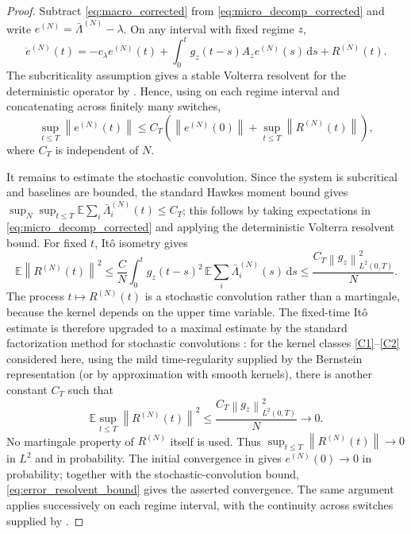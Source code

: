 \documentclass[11pt]{article}
\theoremstyle{plain}
\theoremstyle{definition}
\theoremstyle{remark}
\newcommand{\E}{\mathbb{E}}
\newcommand{\norm}[1]{\left\lVert #1 \right\rVert}
\newcommand{\dd}{\mathrm{d}}
\begin{document}
\begin{proof}
Subtract \eqref{eq:macro_corrected} from \eqref{eq:micro_decomp_corrected} and write
$e^{(N)}=\bar\Lambda^{(N)}-\lambda$. On any interval with fixed regime $z$,
\begin{equation}
\label{eq:error_hydro}
\dot e^{(N)}(t)=-c_\lambda e^{(N)}(t)+\int_0^t g_z(t-s)A_z e^{(N)}(s)\,\dd s+R^{(N)}(t).
\end{equation}
The subcriticality assumption gives a stable Volterra resolvent for the deterministic operator by
. Hence, using  on each regime interval and
concatenating across finitely many switches,
\begin{equation}
\label{eq:error_resolvent_bound}
\sup_{t\le T}\norm{e^{(N)}(t)}
\le C_T\left(\norm{e^{(N)}(0)}+\sup_{t\le T}\norm{R^{(N)}(t)}\right),
\end{equation}
where $C_T$ is independent of $N$.

It remains to estimate the stochastic convolution. Since the system is subcritical and baselines
are bounded, the standard Hawkes moment bound gives
$\sup_N\sup_{t\le T}\E\sum_i\bar\Lambda_i^{(N)}(t)\le C_T$; this follows by taking expectations in
\eqref{eq:micro_decomp_corrected} and applying the deterministic Volterra resolvent bound. For
fixed $t$, It\^o isometry gives
\[
\E\norm{R^{(N)}(t)}^2
\le \frac{C}{N}\int_0^t g_z(t-s)^2\,
     \E\sum_i\bar\Lambda_i^{(N)}(s)\,\dd s
\le \frac{C_T\norm{g_z}_{L^2(0,T)}^2}{N}.
\]
The process $t\mapsto R^{(N)}(t)$ is a stochastic convolution rather than a martingale, because the
kernel depends on the upper time variable. The fixed-time It\^o estimate is therefore upgraded to
a maximal estimate by the standard factorization method for stochastic convolutions
\cite{daPrato1992factorization,daPratoZabczyk1992}: for the kernel classes \ref{C1}--\ref{C2} considered here, using the mild time-regularity supplied by the Bernstein representation (or by approximation with smooth kernels), there is another constant $C_T$ such that
\begin{equation}
\label{eq:stoch_conv_bound}
\E\sup_{t\le T}\norm{R^{(N)}(t)}^2
\le \frac{C_T\norm{g_z}_{L^2(0,T)}^2}{N}\longrightarrow0.
\end{equation}
No martingale property of $R^{(N)}$ itself is used. Thus
$\sup_{t\le T}\norm{R^{(N)}(t)}\to0$ in $L^2$ and in probability. The initial convergence in  gives $e^{(N)}(0)\to0$ in probability; together with the stochastic-convolution bound, \eqref{eq:error_resolvent_bound} gives the asserted convergence. The same
argument applies successively on each regime interval, with the continuity across switches supplied
by .
\end{proof}
\end{document}
